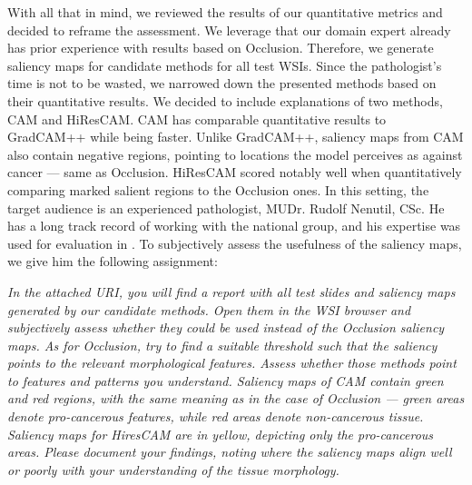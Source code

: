 With all that in mind, we reviewed the results of our quantitative metrics and decided to reframe the assessment.
We leverage that our domain expert already has prior experience with results based on Occlusion.
Therefore, we generate saliency maps for candidate methods for all test WSIs.
Since the pathologist's time is not to be wasted, we narrowed down the presented methods based on their quantitative results.
We decided to include explanations of two methods, CAM and HiResCAM.
CAM has comparable quantitative results to GradCAM++ while being faster.
Unlike GradCAM++, saliency maps from CAM also contain negative regions, pointing to locations the model perceives as against cancer --- same as Occlusion.
HiResCAM scored notably well when quantitatively comparing marked salient regions to the Occlusion ones.
In this setting, the target audience is an experienced pathologist, MUDr. Rudolf Nenutil, CSc.
He has a long track record of working with the national group, and his expertise was used for evaluation in \cite{gallo}.
To subjectively assess the usefulness of the saliency maps, we give him the following assignment:

\emph{
In the attached URI, you will find a report with all test slides and saliency maps generated by our candidate methods.
Open them in the WSI browser and subjectively assess whether they could be used instead of the Occlusion saliency maps.
As for Occlusion, try to find a suitable threshold such that the saliency points to the relevant morphological features.
Assess whether those methods point to features and patterns you understand.
Saliency maps of CAM contain green and red regions, with the same meaning as in the case of Occlusion --- green areas denote pro-cancerous features, while red areas denote non-cancerous tissue.
Saliency maps for HiresCAM are in yellow, depicting only the pro-cancerous areas.
Please document your findings, noting where the saliency maps align well or poorly with your understanding of the tissue morphology.
}

